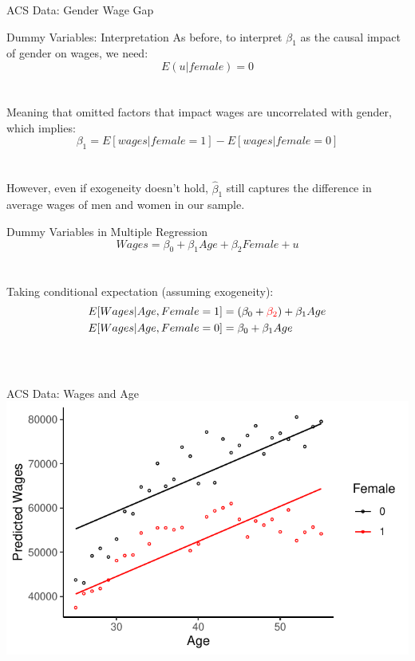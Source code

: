\documentclass{./../div_teaching_slides}
\begin{document}
\begin{frame}{ACS Data: Gender Wage Gap}
\centering  \small \vspace{1.25em}
 \\ \vspace{1.5em}
\end{frame}

\begin{frame}{Dummy Variables: Interpretation}
As before, to interpret $\beta_1$ as the causal impact of gender on wages, we need: $$E(u|female)=0$$ \\~\\
Meaning that omitted factors that impact wages are uncorrelated with gender, which implies:
$$\beta_1 = E[wages | female=1]-E[wages | female=0] $$ \\~\\

However, even if exogeneity doesn't hold, $\hat{\beta}_1$ still captures the difference in average wages of men and women in our sample.  
\end{frame}


\begin{frame}{Dummy Variables in Multiple Regression}
$$ Wages = \beta_0 + \beta_1 Age + \beta_2 Female +  u  $$ \\~\\
Taking conditional expectation (assuming exogeneity):
\begin{align*}
	E[Wages | Age, Female=1] &= (\beta_0+\textcolor{red}{\beta_2}) + \beta_1 Age
 \\
	E[Wages | Age, Female=0] &= \beta_0 + \beta_1 Age
	\end{align*} \\~\\
\end{frame}

\begin{frame}{ACS Data: Wages and Age}
\centering  \small 
\includegraphics{./../../output/fit_gender_age.pdf} \\ \vspace{1.5em}
\end{frame}
\end{document}
